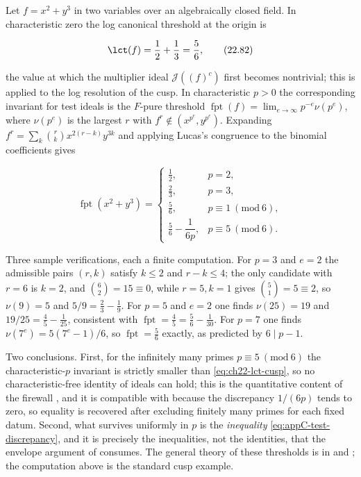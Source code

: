 \begin{example}
\label{ex:ch22-fpt-cusp}
Let \(f=x^2+y^3\) in two variables over an algebraically closed field.  In
characteristic zero the log canonical threshold at the origin is

\[
 \lct(f)=\frac12+\frac13=\frac56 ,
\tag{22.82}\label{eq:ch22-lct-cusp}
\]

the value at which the multiplier ideal
\(\mathcal J((f)^c)\) first becomes nontrivial; this is
 applied to the log resolution of the cusp.  In
characteristic \(p>0\) the corresponding invariant for test ideals is the
\(F\)-pure threshold
\(\operatorname{fpt}(f)=\lim_{e\to\infty}p^{-e}\nu(p^e)\), where
\(\nu(p^e)\) is the largest \(r\) with
\(f^r\notin(x^{p^e},y^{p^e})\).  Expanding
\(f^r=\sum_k\binom rkx^{2(r-k)}y^{3k}\) and applying Lucas's congruence to
the binomial coefficients gives

\[
 \operatorname{fpt}(x^2+y^3)=
 \begin{cases}
  \tfrac12,&p=2,\\[1mm]
  \tfrac23,&p=3,\\[1mm]
  \tfrac56,&p\equiv1\ (\mathrm{mod}\ 6),\\[1mm]
  \tfrac56-\dfrac1{6p},&p\equiv5\ (\mathrm{mod}\ 6).
 \end{cases}
\tag{22.83}\label{eq:ch22-fpt-cusp}
\]

Three sample verifications, each a finite computation.  For \(p=3\) and
\(e=2\) the admissible pairs \((r,k)\) satisfy \(k\leq2\) and
\(r-k\leq4\); the only candidate with \(r=6\) is \(k=2\), and
\(\binom62=15\equiv0\), while \(r=5,k=1\) gives \(\binom51=5\equiv2\), so
\(\nu(9)=5\) and \(5/9=\tfrac23-\tfrac19\).  For \(p=5\) and \(e=2\) one
finds \(\nu(25)=19\) and \(19/25=\tfrac45-\tfrac1{25}\), consistent with
\(\operatorname{fpt}=\tfrac45=\tfrac56-\tfrac1{30}\).  For \(p=7\) one finds
\(\nu(7^e)=5(7^e-1)/6\), so \(\operatorname{fpt}=\tfrac56\) exactly, as
predicted by \(6\mid p-1\).

Two conclusions.  First, for the infinitely many primes
\(p\equiv5\ (\mathrm{mod}\ 6)\) the characteristic-\(p\) invariant is
strictly smaller than \eqref{eq:ch22-lct-cusp}, so no characteristic-free
identity of ideals can hold; this is the quantitative content of the
firewall , and it is compatible
with  because the discrepancy
\(1/(6p)\) tends to zero, so equality is recovered after excluding finitely
many primes for each fixed datum.  Second, what survives uniformly in \(p\)
is the \emph{inequality} \eqref{eq:appC-test-discrepancy}, and it is
precisely the inequalities, not the identities, that the envelope argument
of \cite{GJKM19} consumes.  The general theory of these thresholds is in
\cite{HY03} and \cite{ST12}; the computation above is the standard cusp
example.
\end{example}


